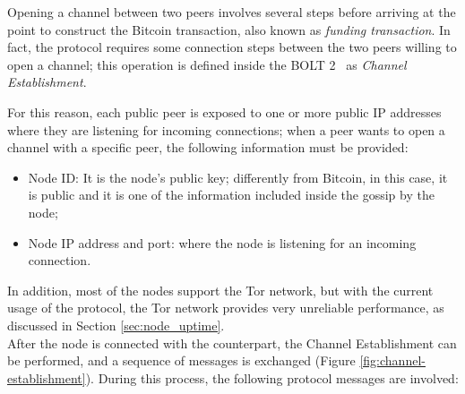 Opening a channel between two peers involves several steps before arriving at the point to construct the Bitcoin transaction, also
known as \emph{funding transaction}.
In fact, the {\LN} protocol requires some connection steps between the two peers willing to open a channel; this
operation is defined inside the BOLT 2~\cite{bolt2} as \emph{Channel Establishment}.

For this reason, each public peer is exposed to one or more public IP addresses where
they are listening for incoming connections; when a peer wants to open
a channel with a specific peer, the following information must be provided:

\begin{itemize}
  \item Node ID: It is the node's public key; differently from Bitcoin, in this case, it is public and it is one of the information included inside the gossip by the node;
  \item Node IP address and port: where the node is listening for an incoming connection.
\end{itemize}

In addition, most of the nodes support the Tor network, but with the current usage of the protocol, the Tor network provides very unreliable
performance, as discussed in Section \ref{sec:node_uptime}.\\
After the node is connected with the counterpart, the Channel Establishment can be performed, and a sequence
of messages is exchanged (Figure \ref{fig:channel-establishment}). During this process,
the following protocol messages are involved:

